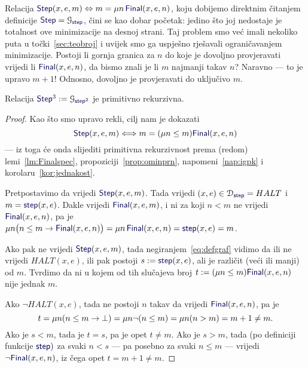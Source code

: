 Relacija $\f{Step}(x,e,m)\Leftrightarrow m= \mu n\,\f{Final}(x,e,n)$, koju dobijemo direktnim čitanjem definicije $\f{Step}=\graf{\f{step}}$, čini se kao dobar početak: jedino što joj nedostaje je totalnost ove minimizacije na desnoj strani. Taj problem smo već imali nekoliko puta u točki~\ref{sec:teobroj} i uvijek smo ga uspješno rješavali ograničavanjem minimizacije. Postoji li gornja granica za $n$ do koje je dovoljno provjeravati vrijedi li $\f{Final}(x,e,n)$, da bismo znali je li $m$ najmanji takav $n$? Naravno --- to je upravo $m+1$! Odnosno, dovoljno je provjeravati do uključivo $m$.

\begin{lema}[{name=[primitivna rekurzivnost grafa brojenja koraka do zaustavljanja]}]
Relacija $\f{Step}^3:=\graf{\f{step}^2}$ je primitivno rekurzivna.
\end{lema}
\begin{proof}
Kao što smo upravo rekli, cilj nam je dokazati
\begin{equation}
    \f{Step}(x,e,m)\Longleftrightarrow m=(\mu n\le m)\f{Final}(x,e,n)
\end{equation}
--- iz toga će onda slijediti primitivna rekurzivnost prema (redom) lemi~\ref{lm:Finalspec}, propoziciji~\ref{prop:ominprn}, napomeni~\ref{nap:igpk} i korolaru~\ref{kor:jednakost}.

Pretpostavimo da vrijedi $\f{Step}(x,e,m)$. Tada vrijedi $(x,e)\in\dom{\f{step}}=HALT$ i $m=\f{step}(x,e)$. Dakle vrijedi $\f{Final}(x,e,m)$, i ni za koji $n<m$ ne vrijedi $\f{Final}(x,e,n)$, pa je $\mu n\bigl(n\le m\to\f{Final}(x,e,n)\bigr)=\mu n\,\f{Final}(x,e,n)=\f{step}(x,e)=m$.

Ako pak ne vrijedi $\f{Step}(x,e,m)$, tada negiranjem~\eqref{eq:defgraf} vidimo da ili ne vrijedi $HALT(x,e)$, ili pak postoji $s:=\f{step}(x,e)$, ali je različit (veći ili manji) od $m$. Tvrdimo da ni u kojem od tih slučajeva broj $t:=(\mu n\le m)\f{Final}(x,e,n)$ nije jednak $m$.

Ako $\lnot HALT(x,e)$, tada ne postoji $n$ takav da vrijedi $\f{Final}(x,e,n)$, pa je
\begin{equation}
    t = \mu n(n\le m\to\bot)=\mu n\lnot(n\le m)=\mu n(n>m)= m+1\ne m\text.
\end{equation}
Ako je $s<m$, tada je $t=s$, pa je opet $t\ne m$. Ako je $s>m$, tada (po definiciji funkcije $\f{step})$ za svaki $n<s$ --- pa posebno za svaki $n\le m$ --- vrijedi $\lnot\f{Final}(x,e,n)$, iz čega opet $t=m+1\ne m$.
\end{proof}

